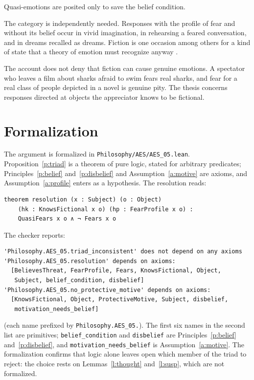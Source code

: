 \documentclass{situationist-preprint}
\begin{document}
\begin{objection}[Ad hoc]
Quasi-emotions are posited only to save the belief condition.
\end{objection}

\begin{reply}
The category is independently needed. Responses with the profile of fear and without its belief occur in vivid imagination, in rehearsing a feared conversation, and in dreams recalled as dreams. Fiction is one occasion among others for a kind of state that a theory of emotion must recognize anyway \citep{Currie1990}.
\end{reply}

The account does not deny that fiction can cause genuine emotions. A spectator who leaves a film about sharks afraid to swim fears real sharks, and fear for a real class of people depicted in a novel is genuine pity. The thesis concerns responses directed at objects the appreciator knows to be fictional.

\section{Formalization}

The argument is formalized in \nolinkurl{Philosophy/AES/AES_05.lean}. Proposition~\ref{p:triad} is a theorem of pure logic, stated for arbitrary predicates; Principles~\ref{p:belief} and~\ref{p:disbelief} and Assumption~\ref{a:motive} are axioms, and Assumption~\ref{a:profile} enters as a hypothesis. The resolution reads:

\begin{lstlisting}
theorem resolution (x : Subject) (o : Object)
    (hk : KnowsFictional x o) (hp : FearProfile x o) :
    QuasiFears x o ∧ ¬ Fears x o
\end{lstlisting}

The checker reports:

\begin{lstlisting}
'Philosophy.AES_05.triad_inconsistent' does not depend on any axioms
'Philosophy.AES_05.resolution' depends on axioms:
  [BelievesThreat, FearProfile, Fears, KnowsFictional, Object,
   Subject, belief_condition, disbelief]
'Philosophy.AES_05.no_protective_motive' depends on axioms:
  [KnowsFictional, Object, ProtectiveMotive, Subject, disbelief,
   motivation_needs_belief]
\end{lstlisting}

(each name prefixed by \texttt{Philosophy.AES\_05.}). The first six names in the second list are primitives; \texttt{belief\_condition} and \texttt{disbelief} are Principles~\ref{p:belief} and~\ref{p:disbelief}, and \texttt{motivation\_needs\_belief} is Assumption~\ref{a:motive}. The formalization confirms that logic alone leaves open which member of the triad to reject: the choice rests on Lemmas~\ref{l:thought} and~\ref{l:susp}, which are not formalized.
\end{document}
